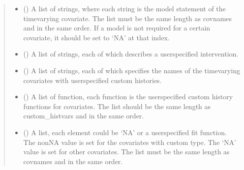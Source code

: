 \documentclass[letterpaper,10pt,english]{sphinxmanual}
\begin{document}
\begin{fulllineitems}
\begin{quote}
\begin{description}
\begin{itemize}
\item {} 
\sphinxAtStartPar
{} (\sphinxstyleliteralemphasis{\sphinxupquote{, }}) \textendash{} A list of strings, where each string is the model statement of the time\sphinxhyphen{}varying covariate. The list
must be the same length as covnames and in the same order. If a model is not required for a certain covariate,
it should be set to ‘NA’ at that index.

\item {} 
\sphinxAtStartPar
{} (\sphinxstyleliteralemphasis{\sphinxupquote{, }}) \textendash{} A list of strings, each of which describes a user\sphinxhyphen{}specified intervention.

\item {} 
\sphinxAtStartPar
{} (\sphinxstyleliteralemphasis{\sphinxupquote{, }}) \textendash{} A list of strings, each of which specifies the names of the time\sphinxhyphen{}varying covariates with user\sphinxhyphen{}specified custom histories.

\item {} 
\sphinxAtStartPar
{} (\sphinxstyleliteralemphasis{\sphinxupquote{, }}) \textendash{} A list of function, each function is the user\sphinxhyphen{}specified custom history functions for covariates. The list
should be the same length as custom\_histvars and in the same order.

\item {} 
\sphinxAtStartPar
{} (\sphinxstyleliteralemphasis{\sphinxupquote{, }}) \textendash{} A list, each element could be ‘NA’ or a user\sphinxhyphen{}specified fit function. The non\sphinxhyphen{}NA value is set
for the covariates with custom type. The ‘NA’ value is set for other covariates. The list must be the
same length as covnames and in the same order.


\end{itemize}
\end{description}
\end{quote}
\end{fulllineitems}
\end{document}
